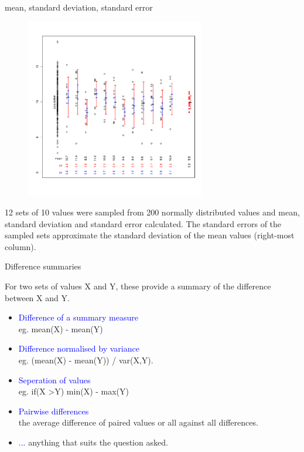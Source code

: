 \documentclass[pdf]{beamer}
\begin{document}
\begin{frame}{mean, standard deviation, standard error}
  \vspace{-1cm}
  \begin{figure}
    \includegraphics[width=0.7\textwidth]{R/mean_sd_se}
  \end{figure}
  \vspace{-1cm}
  \footnotesize 12 sets of 10 values were sampled from 200 normally
  distributed values and mean, standard deviation and standard error
  calculated. The standard errors of the sampled sets approximate the standard
  deviation of the mean values (right-most column).
\end{frame}

\begin{frame}{Difference summaries}

For two sets of values X and Y, these provide a summary of the difference
between X and Y.

\begin{itemize}
\item \textcolor{blue}{Difference of a summary measure}\\ eg. mean(X) - mean(Y)
\item \textcolor{blue}{Difference normalised by variance}\\ eg. (mean(X) -
  mean(Y)) / var(X,Y).
\item \textcolor{blue}{Seperation of values}\\ eg. if(X \textgreater Y) min(X) - max(Y)
\item \textcolor{blue}{Pairwise differences}\\ the average difference of
  paired values or all against all differences.
\item \textcolor{blue}{...} anything that suits the question asked.
\end{itemize}

\end{frame}
\end{document}
